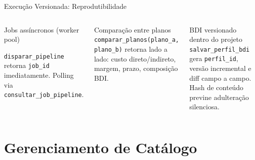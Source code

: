 \documentclass[aspectratio=169,10pt]{beamer}
\begin{document}
\begin{frame}{Execução Versionada: Reprodutibilidade}
\begin{columns}[T]
    \begin{block}{Jobs assíncronos (worker pool)}
      \vspace{2pt}
      {\scriptsize \texttt{disparar\_pipeline} retorna \texttt{job\_id}
      imediatamente. Polling via \texttt{consultar\_job\_pipeline}.}
    \end{block}
    \vspace{4pt}
    \begin{alertblock}{\small Comparação entre planos}
      \scriptsize \texttt{comparar\_planos(plano\_a, plano\_b)} retorna
      lado a lado: custo direto/indireto, margem, prazo, composição BDI.
    \end{alertblock}
    \vspace{4pt}
    \begin{block}{BDI versionado dentro do projeto}
      \scriptsize \texttt{salvar\_perfil\_bdi} gera \texttt{perfil\_id},
      versão incremental e diff campo a campo.
      Hash de conteúdo previne adulteração silenciosa.
    \end{block}
  \end{columns}
\end{frame}

\section{Gerenciamento de Catálogo}
\end{document}
